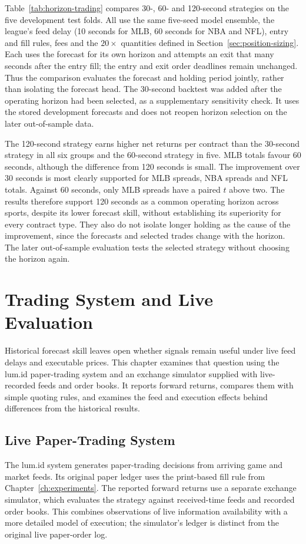 \documentclass[12pt,a4paper,oneside]{report}
\begin{document}
Table~\ref{tab:horizon-trading} compares 30-, 60- and 120-second strategies
on the five development test folds. All use the same five-seed model ensemble,
the league's feed delay (10 seconds for MLB, 60 seconds for NBA and NFL), entry and fill rules, fees and the $20\times$
quantities defined in Section~\ref{sec:position-sizing}. Each uses the forecast for
its own horizon and attempts an exit that many seconds after the entry fill;
the entry and exit order deadlines remain unchanged. Thus the comparison
evaluates the forecast and holding period jointly, rather than isolating the
forecast head. The 30-second backtest was added after the operating horizon
had been selected, as a supplementary sensitivity check. It uses the stored
development forecasts and does not reopen horizon selection on the later
out-of-sample data.



The 120-second strategy earns higher net returns per contract than the
30-second strategy in all six groups and the 60-second strategy in five.
MLB totals favour 60 seconds, although the difference from 120 seconds is small.
The improvement over 30 seconds is most clearly supported for MLB spreads,
NBA spreads and NFL totals.
Against 60 seconds, only MLB spreads have a paired $t$ above two. The results
therefore support 120 seconds as a common operating horizon across sports,
despite its lower forecast skill, without establishing its superiority for
every contract type. They also do not isolate longer holding as the cause of
the improvement, since the forecasts and selected trades change with the
horizon. The later out-of-sample evaluation tests the selected strategy without choosing the
horizon again.


\chapter{Trading System and Live Evaluation}
\label{ch:trading}
Historical forecast skill leaves open whether signals remain useful under
live feed delays and executable prices. This chapter examines that question
using the lum.id paper-trading system and an exchange simulator supplied with
live-recorded feeds and order books. It reports forward returns, compares
them with simple quoting rules, and examines the feed and execution effects
behind differences from the historical results.

\section{Live Paper-Trading System}\label{sec:livesystem}
The lum.id system generates paper-trading decisions from arriving game and
market feeds. Its original paper ledger uses the print-based fill rule from
Chapter~\ref{ch:experiments}. The reported forward returns use a separate
exchange simulator, which evaluates the strategy against received-time feeds
and recorded order books. This combines observations of live information
availability with a more detailed model of execution; the simulator's ledger
is distinct from the original live paper-order log.
\end{document}
